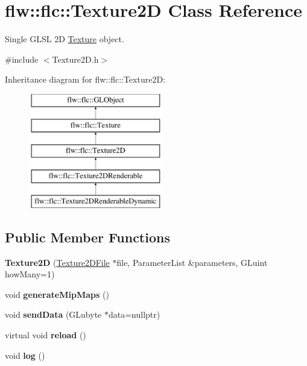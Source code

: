\hypertarget{classflw_1_1flc_1_1Texture2D}{}\section{flw\+:\+:flc\+:\+:Texture2D Class Reference}
\label{classflw_1_1flc_1_1Texture2D}


Single G\+L\+SL 2D \hyperlink{classflw_1_1flc_1_1Texture}{Texture} object.  




{\ttfamily \#include $<$Texture2\+D.\+h$>$}

Inheritance diagram for flw\+:\+:flc\+:\+:Texture2D\+:\begin{figure}[H]
\begin{center}
\leavevmode
\includegraphics[height=5.000000cm]{classflw_1_1flc_1_1Texture2D}
\end{center}
\end{figure}
\subsection*{Public Member Functions}
\begin{DoxyCompactItemize}
\item 
\mbox{\label{classflw_1_1flc_1_1Texture2D_ac654103499013ec5ac498cf26a2ad92e}} 
{\bfseries Texture2D} (\hyperlink{classflw_1_1flc_1_1Texture2DFile}{Texture2\+D\+File} $\ast$file, Parameter\+List \&parameters, G\+Luint how\+Many=1)
\item 
\mbox{\label{classflw_1_1flc_1_1Texture2D_a6812a5516385561270bd8bb19a0ca4be}} 
void {\bfseries generate\+Mip\+Maps} ()
\item 
\mbox{\label{classflw_1_1flc_1_1Texture2D_a1b6b3ce8d1ed95622eceb08a6782a5c5}} 
void {\bfseries send\+Data} (G\+Lubyte $\ast$data=nullptr)
\item 
\mbox{\label{classflw_1_1flc_1_1Texture2D_ac21252a694bd715602b460ab05241c3e}} 
virtual void {\bfseries reload} ()
\item 
\mbox{\label{classflw_1_1flc_1_1Texture2D_a3ad309d16e0f23fc5245d60d4b275c73}} 
void {\bfseries log} ()
\end{DoxyCompactItemize}
